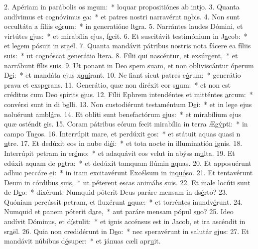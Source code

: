 2. Apériam in parábolis os m\uline{e}um:~* loquar propositiónes ab int\uline{i}o.
3. Quanta audívimus et cognóvimus \uline{e}a:~* et patres nostri narravérnt n\uline{o}bis.
4. Non sunt occultáta a fíliis e\uline{ó}rum:~* in generatióne lt\uline{e}ra.
5. Narrántes laudes Dómini, et virtútes \uline{e}jus:~* et mirabília ejus,  f\uline{e}cit.
6. Et suscitávit testimónium in J\uline{a}cob:~* et legem pósuit in sr\uline{a}ël.
7. Quanta mandávit pátribus nostris nota fácere ea fíliis s\uline{u}is:~* ut cognóscat generátio lt\uline{e}ra.
8. Fílii qui nascéntur, et exs\uline{ú}rgent,~* et narrábunt fílis s\uline{u}is.
9. Ut ponant in Deo spem suam, et non obliviscántur óperum D\uline{e}i:~* et mandáta ejus x\uline{quí}rant.
10. Ne fiant sicut patres e\uline{ó}rum:~* generátio prava et exsp\uline{e}rans.
11. Generátio, quæ non diréxit cor s\uline{u}um:~* et non est créditus cum Deo spírits \uline{e}jus.
12. Fílii Ephrem intendéntes et mitténtes \uline{a}rcum:~* convérsi sunt in di b\uline{e}lli.
13. Non custodiérunt testaméntum D\uline{e}i:~* et in lege ejus noluérunt ambl\uline{á}re.
14. Et oblíti sunt benefactórum \uline{e}jus:~* et mirabílium ejus quæ osténdt \uline{e}is.
15. Coram pátribus eórum fecit mirabília in terra Æg\uline{ý}pti:~* in campo Tn\uline{e}os.
16. Interrúpit mare, et perdúxit \uline{e}os:~* et státuit aquas quasi n \uline{u}tre.
17. Et dedúxit eos in nube di\uline{é}i:~* et tota nocte in illuminatión \uline{i}gnis.
18. Interrúpit petram in er\uline{é}mo:~* et adaquávit eos velut in abýss m\uline{u}lta.
19. Et edúxit aquam de p\uline{e}tra:~* et dedúxit tamquam flúmin \uline{a}quas.
20. Et apposuérunt adhuc peccáre \uline{e}i:~* in iram excitavérunt Excélsum in in\uline{quó}so.
21. Et tentavérunt Deum in córdibus s\uline{u}is,~* ut péterent escas animábs s\uline{u}is.
22. Et male locúti sunt de D\uline{e}o:~* dixérunt: Numquid póterit Deus paráre mensam in ds\uline{é}rto?
23. Quóniam percússit petram, et fluxérunt \uline{a}quæ:~* et torréntes inundv\uline{é}runt.
24. Numquid et panem póterit d\uline{a}re,~* aut paráre mensam pópul s\uline{u}o?
25. Ideo audívit Dóminus, et d\uline{í}stulit:~* et ignis accénsus est in Jacob, et ira ascéndit in sr\uline{a}ël.
26. Quia non credidérunt in D\uline{e}o:~* nec speravérunt in salutár \uline{e}jus:
27. Et mandávit núbibus d\uline{é}super:~* et jánuas cæli apr\uline{u}it.
